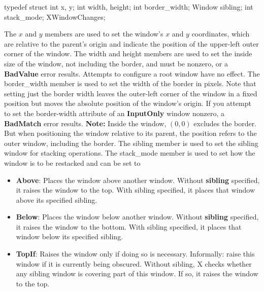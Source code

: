 \documentclass{report}
\begin{document}
\begin{itemize}
\begin{cppcode}
                typedef struct {
                    int x, y;
                    int width, height;
                    int border_width;
                    Window sibling;
                    int stack_mode;
                } XWindowChanges;
            \end{cppcode}
            \bigbreak \noindent 
            The $x$ and $y$ members are used to set the window’s $x$ and $y$ coordinates, which are relative to the parent’s origin and indicate the position of the upper-left outer corner of the window. The width and height members are used to set the inside size of the window, not including the border, and must be nonzero, or a \textbf{BadValue} error results. Attempts to configure a root window have no effect.
            \bigbreak \noindent 
            The border\_width member is used to set the width of the border in pixels. Note that setting just the border width leaves the outer-left corner of the window in a fixed position but moves the absolute position of the window’s origin. If you attempt to set the border-width attribute of an \textbf{InputOnly} window nonzero, a \textbf{BadMatch} error results.
            \bigbreak \noindent 
            \textbf{Note:} Inside the window, $(0,0)$ excludes the border. But when positioning the window relative to its parent, the position refers to the outer window, including the border.
            \bigbreak \noindent 
            The sibling member is used to set the sibling window for stacking operations. The stack\_mode member is used to set how the window is to be restacked and can be set to 
            \begin{itemize}
                \item \textbf{Above}: Places the window above another window. Without \textbf{sibling} specified, it raises the window to the top. With sibling specified, it places that window above its specified sibling.
                \item \textbf{Below}: Places the window below another window. Without \textbf{sibling} specified, it raises the window to the bottom. With sibling specified, it places that window below its specified sibling.
                \item \textbf{TopIf}: 
                    Raises the window only if doing so is necessary. Informally: raise this window if it is currently being obscured.
                    \bigbreak \noindent 
                    Without sibling, X checks whether any sibling window is covering part of this window. If so, it raises the window to the top.

\end{itemize}
\end{itemize}
\end{document}
